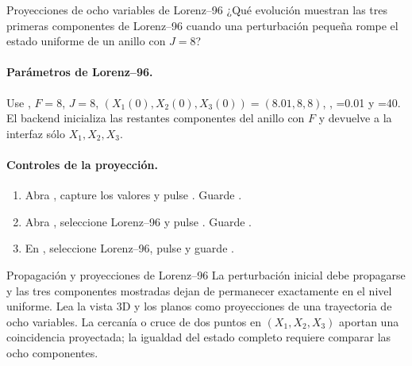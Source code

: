 \begin{cajaazul}{Proyecciones de ocho variables de Lorenz--96}
¿Qué evolución muestran las tres primeras componentes de Lorenz--96 cuando una
perturbación pequeña rompe el estado uniforme de un anillo con \(J=8\)?
\end{cajaazul}

\paragraph{Parámetros de Lorenz--96.}
Use , \(F=8\), \(J=8\),
\((X_1(0),X_2(0),X_3(0))=(8.01,8,8)\),
, =0.01 y
=40. El backend inicializa las restantes componentes del
anillo con \(F\) y devuelve a la interfaz sólo \(X_1,X_2,X_3\).

\paragraph{Controles de la proyección.}
\begin{enumerate}
  \item Abra , capture los valores y pulse
  . Guarde
  .
  \item Abra , seleccione Lorenz--96 y pulse
  . Guarde
  .
  \item En , seleccione Lorenz--96, pulse
   y guarde
  .
\end{enumerate}

\begin{cajaverde}{Propagación y proyecciones de Lorenz--96}
La perturbación inicial debe propagarse y las tres componentes mostradas dejan
de permanecer exactamente en el nivel uniforme. Lea la vista 3D y los planos
como proyecciones de una trayectoria de ocho variables. La cercanía o cruce de
dos puntos en \((X_1,X_2,X_3)\) aportan una coincidencia proyectada; la igualdad
del estado completo requiere comparar las ocho componentes.
\end{cajaverde}


